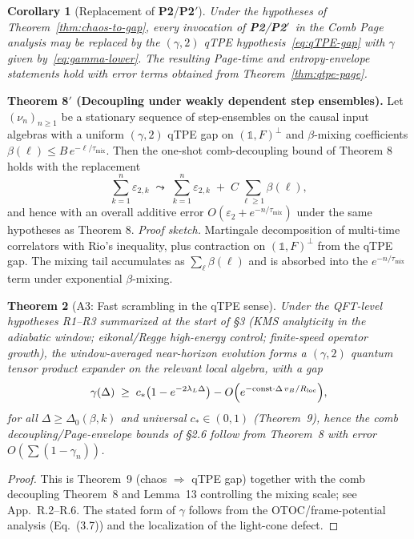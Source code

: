 \documentclass[11pt,a4paper]{article}
\newcommand{\Ptwo}{\textbf{P2}\xspace}
\newcommand{\PtwoPrime}{\textbf{P2$'$}\xspace}
\theoremstyle{plain}
\newtheorem{theorem}{Theorem}
\newtheorem{corollary}[theorem]{Corollary}
\theoremstyle{definition}
\theoremstyle{remark}
\begin{document}
\begin{corollary}[Replacement of \Ptwo/\PtwoPrime]\label{cor:replace-P2}
Under the hypotheses of Theorem~\ref{thm:chaos-to-gap}, every invocation of \Ptwo/\PtwoPrime\ in the Comb Page analysis may be replaced by the $(\gamma,2)$ qTPE hypothesis~\eqref{eq:qTPE-gap} with $\gamma$ given by~\eqref{eq:gamma-lower}. The resulting Page-time and entropy-envelope statements hold with error terms obtained from Theorem~\ref{thm:qtpe-page}.
\end{corollary}

% 
\medskip\noindent\textbf{Theorem 8$'$ (Decoupling under weakly dependent step ensembles).}
Let \((\nu_n)_{n\ge 1}\) be a stationary sequence of step-ensembles on the causal input algebras with a uniform \((\gamma,2)\) qTPE gap on \((\mathbb{1},F)^\perp\) and \(\beta\)-mixing coefficients \(\beta(\ell)\le B\,e^{-\ell/\tau_{\mathrm{mix}}}\). Then the one-shot comb-decoupling bound of Theorem 8 holds with the replacement
\[
  \sum_{k=1}^n \varepsilon_{2,k} \;\leadsto\; \sum_{k=1}^n \varepsilon_{2,k} \;+\; C\,\!\sum_{\ell\ge 1}\beta(\ell),
\]
and hence with an overall additive error \(O(\varepsilon_2 + e^{-n/\tau_{\mathrm{mix}}})\) under the same hypotheses as Theorem 8. 
\emph{Proof sketch.} Martingale decomposition of multi-time correlators with Rio's inequality, plus contraction on \((\mathbb{1},F)^\perp\) from the qTPE gap. The mixing tail accumulates as \(\sum_\ell \beta(\ell)\) and is absorbed into the \(e^{-n/\tau_{\mathrm{mix}}}\) term under exponential \(\beta\)-mixing.

\begin{theorem}[A3: Fast scrambling in the qTPE sense]\label{thm:A3-qTPE}\label{def:scrambling-quantified}
Under the QFT-level hypotheses R1--R3 summarized at the start of \S3 (KMS analyticity in the adiabatic window; eikonal/Regge high-energy control; finite-speed operator growth), the window-averaged near-horizon evolution forms a $(\gamma,2)$ quantum tensor product expander on the relevant local algebra, with a gap
\[
\gamma(\Delta) \;\ge\; c_*\!\left(1-e^{-2\lambda_L \Delta}\right) - O\!\left(e^{-\mathrm{const}\cdot \Delta\, v_B/R_{\rm loc}}\right)\!,
\]
for all $\Delta\ge \Delta_0(\beta,k)$ and universal $c_*\in(0,1)$ (Theorem~9), hence the comb decoupling/Page-envelope bounds of \S2.6 follow from Theorem~8 with error $O(\sum (1-\gamma_n))$.
\end{theorem}

\begin{proof}
This is Theorem~9 (chaos $\Rightarrow$ qTPE gap) together with the comb decoupling Theorem~8 and Lemma~13 controlling the mixing scale; see App.~R.2--R.6. The stated form of $\gamma$ follows from the OTOC/frame-potential analysis (Eq.~(3.7)) and the localization of the light-cone defect. 
\end{proof}
\end{document}
